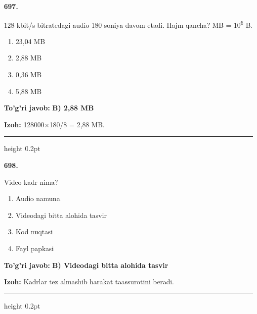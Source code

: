 \documentclass[10pt,a4paper,oneside]{article}
\begin{document}
\noindent\textbf{\color{ink}697.}
\par
128 kbit/s bitratedagi audio 180 soniya davom etadi. Hajm qancha? MB = 10\textsuperscript{6} B.
\begin{enumerate}[label=\Alph*),leftmargin=9mm]
\item 23,04 MB
\item 2,88 MB
\item 0,36 MB
\item 5,88 MB
\end{enumerate}
\begin{tcolorbox}[enhanced,breakable,colback=teal!4,colframe=teal!50!black,boxrule=0.5pt,arc=1.1mm,left=3mm,right=3mm,top=1.7mm,bottom=1.7mm,before skip=2mm,after skip=2mm]
\textbf{\color{teal}To'g'ri javob:} \textbf{B) 2,88 MB}
\par\smallskip
\textbf{Izoh:} 128000\ensuremath{\times}180/8 = 2,88 MB.
\end{tcolorbox}
\vspace{2mm}\hrule height 0.2pt \vspace{3mm}

\noindent\textbf{\color{ink}698.}
\par
Video kadr nima?
\begin{enumerate}[label=\Alph*),leftmargin=9mm]
\item Audio namuna
\item Videodagi bitta alohida tasvir
\item Kod nuqtasi
\item Fayl papkasi
\end{enumerate}
\begin{tcolorbox}[enhanced,breakable,colback=teal!4,colframe=teal!50!black,boxrule=0.5pt,arc=1.1mm,left=3mm,right=3mm,top=1.7mm,bottom=1.7mm,before skip=2mm,after skip=2mm]
\textbf{\color{teal}To'g'ri javob:} \textbf{B) Videodagi bitta alohida tasvir}
\par\smallskip
\textbf{Izoh:} Kadrlar tez almashib harakat taassurotini beradi.
\end{tcolorbox}
\vspace{2mm}\hrule height 0.2pt \vspace{3mm}
\end{document}
